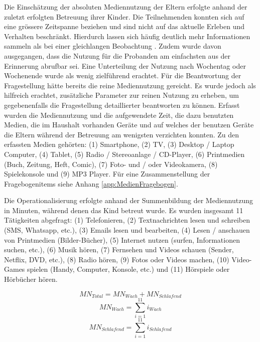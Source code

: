 Die Einschätzung der absoluten Mediennutzung der Eltern erfolgte anhand der zuletzt erfolgten Betreuung ihrer Kinder. Die Teilnehmenden konnten sich auf eine grössere Zeitspanne beziehen und sind nicht auf das aktuelle Erleben und Verhalten beschränkt. Hierdurch lassen sich häufig deutlich mehr Informationen sammeln als bei einer gleichlangen Beobachtung \cite{Berk2005}. Zudem wurde davon ausgegangen, dass die Nutzung für die Probanden am einfachsten aus der Erinnerung abrufbar sei. Eine Unterteilung der Nutzung nach Wochentag oder Wochenende wurde als wenig zielführend erachtet. Für die Beantwortung der Fragestellung hätte bereits die reine Mediennutzung gereicht. Es wurde jedoch als hilfreich erachtet, zusätzliche Parameter zur reinen Nutzung zu erheben, um gegebenenfalls die Fragestellung detaillierter beantworten zu können. Erfasst wurden die Mediennutzung und die aufgewendete Zeit, die dazu benutzten Medien, die im Haushalt vorhanden Geräte und auf welches der benutzen Geräte die Eltern während der Betreuung am wenigsten verzichten konnten. Zu den erfassten Medien gehörten: (1) Smartphone, (2) TV, (3) Desktop / Laptop Computer, (4) Tablet, (5) Radio / Stereoanlage / CD-Player, (6) Printmedien (Buch, Zeitung, Heft, Comic), (7) Foto- und / oder Videokamera, (8) Spielekonsole und (9) MP3 Player. Für eine Zusammenstellung der Fragebogenitems siehe Anhang \ref{app:MedienFragebogen}.

Die Operationalisierung erfolgte anhand der Summenbildung der Mediennutzung in Minuten, während denen das Kind betreut wurde. Es wurden insgesamt 11 Tätigkeiten abgefragt: (1) Telefonieren, (2) Textnachrichten lesen und schreiben (SMS, Whatsapp, etc.), (3) Emails lesen und bearbeiten, (4) Lesen / anschauen von Printmedien (Bilder-Bücher), (5) Internet nutzen (surfen, Informationen suchen, etc.), (6) Musik hören, (7) Fernsehen und Videos schauen (Sender, Netflix, DVD, etc.), (8) Radio hören, (9) Fotos oder Videos machen, (10) Video-Games spielen (Handy, Computer, Konsole, etc.) und (11) Hörspiele oder Hörbücher hören. 

\begin{equation}\label{eq:MedienTotal}
    MN_{Total}=MN_{Wach} + MN_{Schlafend}
\end{equation}
\begin{equation}\label{eq:MedienWach}
    MN_{Wach}=\sum_{i=1}^{11} i_{Wach}
\end{equation}
\begin{equation}\label{eq:MedienSchlafend}
    MN_{Schlafend}=\sum_{i=1}^{11} i_{Schlafend}
\end{equation}

